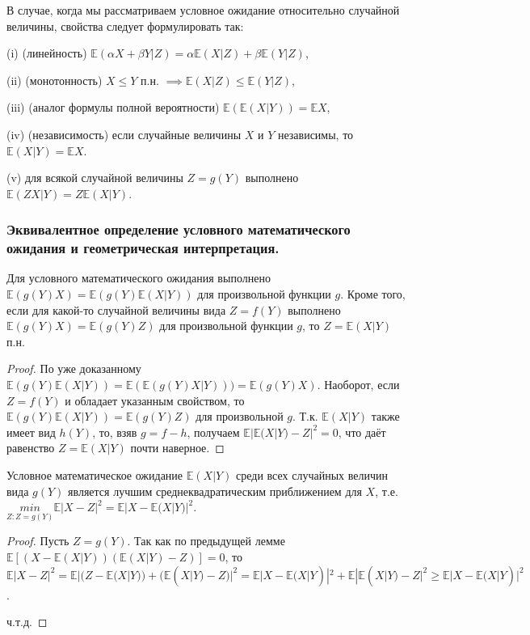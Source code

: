 \begin{theorem}
	В случае, когда мы рассматриваем условное ожидание относительно случайной величины, свойства следует формулировать так:
	
	(i) (линейность) $\mathbb{E}(\alpha X + \beta Y |Z) = \alpha\mathbb{E}(X|Z) + \beta\mathbb{E}(Y | Z)$,
	
	(ii) (монотонность) $X \leqslant Y$ п.н. $\implies \mathbb{E}(X|Z) \leqslant \mathbb{E}(Y|Z)$,
	
	(iii) (аналог формулы полной вероятности) $\mathbb{E}(\mathbb{E}(X|Y)) = \mathbb{E}X$,
	
	(iv) (независимость) если случайные величины $X$ и $Y$ независимы, то $\mathbb{E}(X|Y) = \mathbb{E}X$.
	
	(v) для всякой случайной величины $Z = g(Y)$ выполнено $\mathbb{E}(ZX|Y ) = Z\mathbb{E}(X|Y )$.
\end{theorem}

\subsubsection{Эквивалентное определение условного математического ожидания и геометрическая интерпретация.}

Для условного математического ожидания выполнено $\mathbb{E}(g(Y)X) = \mathbb{E}(g(Y)\mathbb{E}(X|Y))$ для произвольной функции $g$. Кроме того, если для какой-то случайной величины вида $Z = f(Y)$ выполнено $\mathbb{E}(g(Y)X) = \mathbb{E}(g(Y)Z)$ для произвольной функции $g$, то $Z = \mathbb{E}(X|Y)$ п.н.

\begin{proof} По уже доказанному $\mathbb{E}(g(Y)\mathbb{E}(X|Y))= \mathbb{E}(\mathbb{E}(g(Y)X|Y)))=\mathbb{E}(g(Y)X)$. Наоборот, если $Z = f(Y)$ и обладает указанным свойством, то $\mathbb{E}(g(Y)\mathbb{E}(X|Y))=\mathbb{E}(g(Y)Z)$ для произвольной $g$. Т.к. $\mathbb{E}(X|Y)$ также имеет вид $h(Y)$, то, взяв $g = f - h$, получаем $\mathbb{E}|\mathbb{E}(X|Y)-Z|^2 = 0$, что даёт равенство $Z = \mathbb{E}(X|Y)$ почти наверное.
\end{proof}

\begin{proposal}
	Условное математическое ожидание $\mathbb{E}(X|Y)$ среди всех случайных	величин вида $g(Y)$ является лучшим среднеквадратическим приближением для $X$, т.е. $\underset{Z:Z=g(Y )}{min}	\mathbb{E}|X-Z|^2 = \mathbb{E}|X-\mathbb{E}(X|Y)|^2$.
\end{proposal}

\begin{proof}
	Пусть $Z = g(Y)$. Так как по предыдущей лемме $\mathbb{E}[(X - \mathbb{E}(X|Y))(\mathbb{E}(X|Y) - Z)] = 0$, то $\mathbb{E}|X - Z|^2 = \mathbb{E}|(Z-\mathbb{E}(X|Y)) + (\mathbb{E}(X|Y)-Z)|^2 = \mathbb{E}|X-\mathbb{E}(X|Y)|^2 + \mathbb{E}|\mathbb{E}(X|Y)-Z|^2 \geqslant \mathbb{E}|X - \mathbb{E}(X|Y)|^2$.
	
	ч.т.д.
\end{proof}

